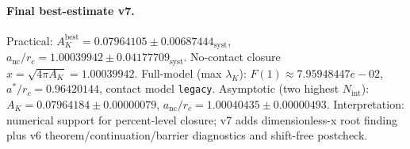 \paragraph{Final best-estimate v7.}
Practical: $A_K^{\mathrm{best}} = 0.07964105 \pm 0.00687444_{\mathrm{syst}}$, $a_{\mathrm{nc}}/r_c = 1.00039942 \pm 0.04177709_{\mathrm{syst}}$.
No-contact closure $x = \sqrt{4\pi A_K} = 1.00039942$.
Full-model (max $\lambda_K$): $F(1) \approx 7.95948447e-02$, $a^*/r_c = 0.96420144$, contact model \texttt{legacy}.
Asymptotic (two highest $N_{\mathrm{int}}$): $A_K = 0.07964184 \pm 0.00000079$, $a_{\mathrm{nc}}/r_c = 1.00040435 \pm 0.00000493$.
Interpretation: numerical support for percent-level closure; v7 adds dimensionless-x root finding plus v6 theorem/continuation/barrier diagnostics and shift-free postcheck.

